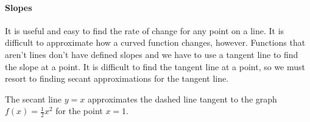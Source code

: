 \documentclass[../revisedmain.tex]{subfiles}
\begin{document}
\paragraph{Slopes} It is useful and easy to find the rate of change for any point on a line. It is difficult to approximate how a curved function changes, however. Functions that aren't lines don't have defined slopes and we have to use a tangent line to find the slope at a point. It is difficult to find the tangent line at a point, so we must resort to finding secant approximations for the tangent line.
\begin{center}
\par The secant line $y=x$ approximates the dashed line tangent to the graph $f(x)=\frac{1}{2} x^2$ for the point $x=1$.
\end{center}
\end{document}
